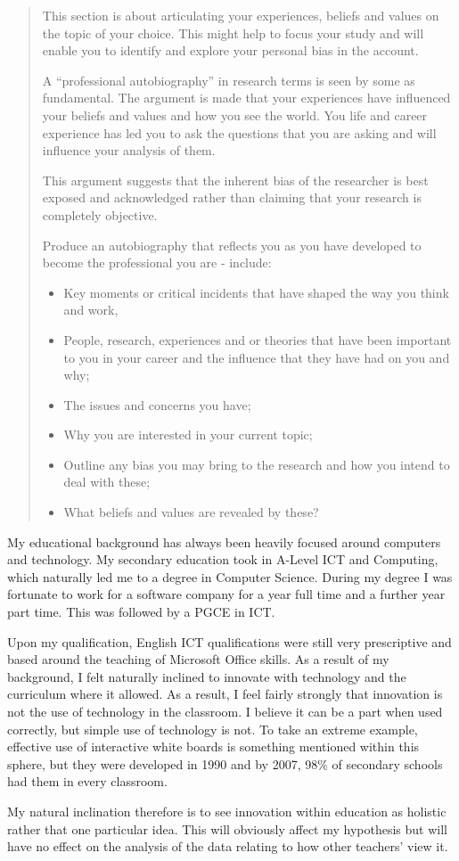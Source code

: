 \begin{quote}
This section is about articulating your experiences, beliefs and values on the topic of your choice. This might help to focus your study and will enable you to identify and explore your personal bias in the account. 

A “professional autobiography” in research terms is seen by some as fundamental. The argument is made that your experiences have influenced your beliefs and values and how you see the world. You life and career experience has led you to ask the questions that you are asking and will influence your analysis of them.

This argument suggests that the inherent bias of the researcher is best exposed and acknowledged rather than claiming that your research is completely objective. 

Produce an autobiography that reflects you as you have developed to become the professional you are - include: 
\begin{itemize}
\item Key moments or critical incidents that have shaped the way you think and work, 
\item People, research, experiences and or theories that have been important to you in your career and the influence that they have had on you and why;
\item The issues and concerns you have;
\item Why you are interested in your current topic;
\item Outline any bias you may bring to the research and how you intend to deal with these;
\item What beliefs and values are revealed by these?
\end{itemize}
\end{quote}
My educational background has always been heavily focused around computers and technology. My secondary education took in A-Level ICT and Computing, which naturally led me to a degree in Computer Science. During my degree I was fortunate to work for a software company for a year full time and a further year part time. This was followed by a PGCE in ICT.

Upon my qualification, English ICT qualifications were still very prescriptive and based around the teaching of Microsoft Office skills. As a result of my background, I felt naturally inclined to innovate with technology and the curriculum where it allowed. As a result, I feel fairly strongly that innovation is not the use of technology in the classroom. I believe it can be a part when used correctly, but simple use of technology is not. To take an extreme example, effective use of interactive white boards is something mentioned within this sphere, but they were developed in 1990 and by 2007, 98\% \cite{kitchen2008harnessing} of secondary schools had them in every classroom.

My natural inclination therefore is to see innovation within education as holistic rather that one particular idea. This will obviously affect my hypothesis but will have no effect on the analysis of the data relating to how other teachers' view it.

